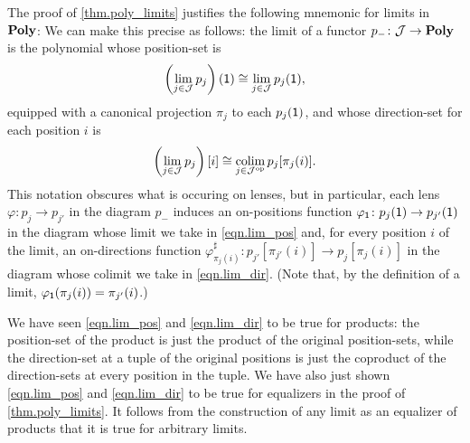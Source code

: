 \documentclass[Book-Poly]{subfiles}
\begin{document}
\begin{example} \label{ex.compute_limits}
The proof of \cref{thm.poly_limits} justifies the following mnemonic for limits in $\mathbf{Poly}$:
We can make this precise as follows: the limit of a functor $p_-\colon\mathcal{J}\to\mathbf{Poly}$ is the polynomial whose position-set is
\begin{equation} \label{eqn.lim_pos}
    \left(\lim_{j\in\mathcal{J}} p_j\right)(\textsf{1}) \cong \lim_{j\in\mathcal{J}} p_j(\textsf{1}),
\end{equation}
equipped with a canonical projection $\pi_j$ to each $p_j(\textsf{1})$, and whose direction-set for each position $i$ is
\begin{equation} \label{eqn.lim_dir}
    \left(\lim_{j\in\mathcal{J}} p_j\right)[i] \cong \operatorname*{colim}_{j\in\mathcal{J}^{\textnormal{op}}} p_j[\pi_j(i)].
\end{equation}
This notation obscures what is occuring on lenses, but in particular, each lens $\varphi\colon p_j\to p_{j'}$ in the diagram $p_-$ induces an on-positions function $\varphi_{\textsf{1}}\colon p_j(\textsf{1})\to p_{j'}(\textsf{1})$ in the diagram whose limit we take in \eqref{eqn.lim_pos} and, for every position $i$ of the limit, an on-directions function $\varphi^\sharp_{\pi_j(i)}\colon p_{j'}[\pi_{j'}(i)]\to p_j[\pi_j(i)]$ in the diagram whose colimit we take in \eqref{eqn.lim_dir}.
(Note that, by the definition of a limit, $\varphi_{\textsf{1}}(\pi_j(i)) = \pi_{j'}(i)$.)

We have seen \eqref{eqn.lim_pos} and \eqref{eqn.lim_dir} to be true for products: the position-set of the product is just the product of the original position-sets, while the direction-set at a tuple of the original positions is just the coproduct of the direction-sets at every position in the tuple.
We have also just shown \eqref{eqn.lim_pos} and \eqref{eqn.lim_dir} to be true for equalizers in the proof of \cref{thm.poly_limits}.
It follows from the construction of any limit as an equalizer of products that it is true for arbitrary limits.
\end{example}
\end{document}
